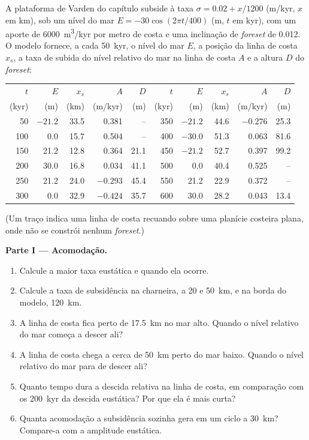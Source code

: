\begin{problem}
\label{pb:b3:sequence-stratigraphy:1}
A plataforma de Varden do capítulo subside à taxa $\sigma = 0.02 + x/1200$
(\unit{m/kyr}, $x$ em km), sob um nível do mar $E = -30\cos(2\pi t/400)$ (m,
$t$ em kyr), com um aporte de \qty{6000}{m^3/kyr} por metro de costa e uma
inclinação de \textit{foreset} de 0.012. O modelo fornece, a cada \qty{50}{kyr}, o nível do mar
$E$, a posição da linha de costa $x_s$, a taxa de subida do nível relativo do mar na
linha de costa $A$ e a altura $D$ do \textit{foreset}:

\begin{center}\small
\begin{tabular}{rrrrr|rrrrr}
$t$ & $E$ & $x_s$ & $A$ & $D$ & $t$ & $E$ & $x_s$ & $A$ & $D$\\
(kyr) & (m) & (km) & (m/kyr) & (m) & (kyr) & (m) & (km) & (m/kyr) & (m)\\\hline
50 & $-21.2$ & 33.5 & 0.381 & -- & 350 & $-21.2$ & 44.6 & $-0.276$ & 25.3\\
100 & 0.0 & 15.7 & 0.504 & -- & 400 & $-30.0$ & 51.3 & 0.063 & 81.6\\
150 & 21.2 & 12.8 & 0.364 & 21.1 & 450 & $-21.2$ & 52.7 & 0.397 & 99.2\\
200 & 30.0 & 16.8 & 0.034 & 41.1 & 500 & 0.0 & 40.4 & 0.525 & --\\
250 & 21.2 & 24.0 & $-0.293$ & 45.4 & 550 & 21.2 & 22.9 & 0.372 & --\\
300 & 0.0 & 32.9 & $-0.424$ & 35.7 & 600 & 30.0 & 28.2 & 0.043 & 13.4\\
\end{tabular}
\end{center}
(Um traço indica uma linha de costa recuando sobre uma planície costeira plana, onde não
se constrói nenhum \textit{foreset}.)

\medskip\noindent\textbf{Parte I --- Acomodação.}
\begin{enumerate}
\item Calcule a maior taxa eustática e quando ela ocorre.
\item Calcule a taxa de subsidência na charneira, a 20 e \qty{50}{km}, e
  na borda do modelo, \qty{120}{km}.
\item A linha de costa fica perto de \qty{17.5}{km} no mar alto. Quando
  o nível relativo do mar começa a descer ali?
\item A linha de costa chega a cerca de \qty{50}{km} perto do mar baixo. Quando
  o nível relativo do mar para de descer ali?
\item Quanto tempo dura a descida relativa na linha de costa, em comparação com
  os \qty{200}{kyr} da descida eustática? Por que ela é mais curta?
\item Quanta acomodação a subsidência sozinha gera em um ciclo a
  \qty{30}{km}? Compare-a com a amplitude eustática.
\end{enumerate}


\end{problem}
